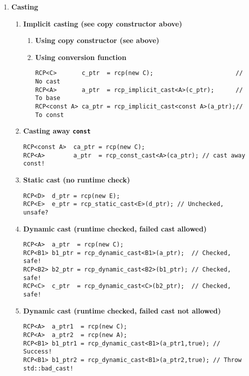 \documentclass[pdf,ps2pdf,11pt]{SANDreport}
\begin{document}
\begin{enumerate}
\item {\bf Casting}
\label{rcpqs:apdx:qs:casting}
%
\begin{enumerate}
%
\item {\bf Implicit casting (see copy constructor above)}
%
\begin{enumerate}
%
\item {\bf Using copy constructor (see above)}
%
\item {\bf Using conversion function}
%
{\small\begin{verbatim}
RCP<C>       c_ptr  = rcp(new C);                       // No cast
RCP<A>       a_ptr  = rcp_implicit_cast<A>(c_ptr);      // To base
RCP<const A> ca_ptr = rcp_implicit_cast<const A>(a_ptr);// To const
\end{verbatim}}
%
\end{enumerate}
%
\item {\bf Casting away \texttt{const}}
%
{\small\begin{verbatim}
RCP<const A>  ca_ptr = rcp(new C);
RCP<A>        a_ptr  = rcp_const_cast<A>(ca_ptr); // cast away const!
\end{verbatim}}
%
\item {\bf Static cast (no runtime check)}
%
{\small\begin{verbatim}
RCP<D>  d_ptr = rcp(new E);
RCP<E>  e_ptr = rcp_static_cast<E>(d_ptr); // Unchecked, unsafe?
\end{verbatim}}
%
\item {\bf Dynamic cast (runtime checked, failed cast allowed)}
%
{\small\begin{verbatim}
RCP<A>  a_ptr  = rcp(new C);
RCP<B1> b1_ptr = rcp_dynamic_cast<B1>(a_ptr);  // Checked, safe!
RCP<B2> b2_ptr = rcp_dynamic_cast<B2>(b1_ptr); // Checked, safe!
RCP<C>  c_ptr  = rcp_dynamic_cast<C>(b2_ptr);  // Checked, safe!
\end{verbatim}}
%
\item {\bf Dynamic cast (runtime checked, failed cast not allowed)}
%
{\small\begin{verbatim}
RCP<A>  a_ptr1  = rcp(new C);
RCP<A>  a_ptr2  = rcp(new A);
RCP<B1> b1_ptr1 = rcp_dynamic_cast<B1>(a_ptr1,true); // Success!
RCP<B1> b1_ptr2 = rcp_dynamic_cast<B1>(a_ptr2,true); // Throw std::bad_cast!
\end{verbatim}}
%
\end{enumerate}

\pagebreak


\end{enumerate}
\end{document}
